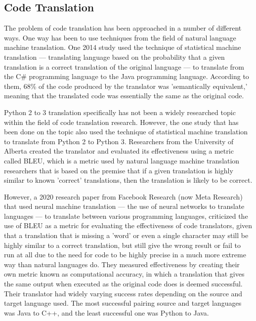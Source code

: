 \subsection{Code Translation}
The problem of code translation has been approached in a number of different ways. One way has been to use techniques from the field of natural language machine translation. One 2014 study used the technique of statistical machine translation --- translating language based on the probability that a given translation is a correct translation of the original language --- to translate from the C\# programming language to the Java programming language. According to them, 68\% of the code produced by the translator was 'semantically equivalent,' meaning that the translated code was essentially the same as the original code.

Python 2 to 3 translation specifically has not been a widely researched topic within the field of code translation research. However, the one study that has been done on the topic also used the technique of statistical machine translation to translate from Python 2 to Python 3. Researchers from the University of Alberta created the translator and evaluated its effectiveness using a metric called BLEU, which is a metric used by natural language machine translation researchers that is based on the premise that if a given translation is highly similar to known 'correct' translations, then the translation is likely to be correct.

However, a 2020 research paper from Facebook Research (now Meta Research) that used neural machine translation --- the use of neural networks to translate languages --- to translate between various programming languages, criticized the use of BLEU as a metric for evaluating the effectiveness of code translators, given that a translation that is missing a 'word' or even a single character may still be highly similar to a correct translation, but still give the wrong result or fail to run at all due to the need for code to be highly precise in a much more extreme way than natural languages do. They measured effectiveness by creating their own metric known as computational accuracy, in which a translation that gives the same output when executed as the original code does is deemed successful. Their translator had widely varying success rates depending on the source and target language used. The most successful pairing source and target languages was Java to C++, and the least successful one was Python to Java.

